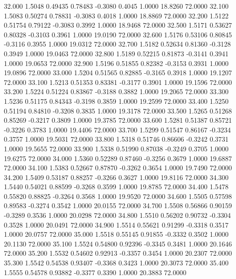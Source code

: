   32.000   1.5048   0.49435   0.78483  -0.3080   0.4045   1.0000  18.8260  72.0000
  32.100   1.5083   0.50274   0.78831  -0.3083   0.4018   1.0000  18.8869  72.0000
  32.200   1.5122   0.51754   0.79122  -0.3083   0.3992   1.0000  18.9468  72.0000
  32.500   1.5171   0.53627   0.80328  -0.3103   0.3961   1.0000  19.0190  72.0000
  32.600   1.5176   0.53106   0.80845  -0.3116   0.3955   1.0000  19.0312  72.0000
  32.700   1.5182   0.52634   0.81360  -0.3128   0.3949   1.0000  19.0463  72.0000
  32.800   1.5189   0.52215   0.81873  -0.3141   0.3941   1.0000  19.0653  72.0000
  32.900   1.5196   0.51855   0.82382  -0.3153   0.3931   1.0000  19.0896  72.0000
  33.000   1.5204   0.51565   0.82885  -0.3165   0.3918   1.0000  19.1207  72.0000
  33.100   1.5213   0.51353   0.83381  -0.3177   0.3901   1.0000  19.1596  72.0000
  33.200   1.5224   0.51224   0.83867  -0.3188   0.3882   1.0000  19.2065  72.0000
  33.300   1.5236   0.51175   0.84343  -0.3198   0.3859   1.0000  19.2599  72.0000
  33.400   1.5250   0.51194   0.84810  -0.3208   0.3835   1.0000  19.3178  72.0000
  33.500   1.5265   0.51268   0.85269  -0.3217   0.3809   1.0000  19.3785  72.0000
  33.600   1.5281   0.51387   0.85721  -0.3226   0.3783   1.0000  19.4406  72.0000
  33.700   1.5299   0.51547   0.86167  -0.3234   0.3757   1.0000  19.5031  72.0000
  33.800   1.5318   0.51746   0.86606  -0.3242   0.3731   1.0000  19.5655  72.0000
  33.900   1.5338   0.51990   0.87038  -0.3249   0.3705   1.0000  19.6275  72.0000
  34.000   1.5360   0.52289   0.87460  -0.3256   0.3679   1.0000  19.6887  72.0000
  34.100   1.5383   0.52667   0.87870  -0.3262   0.3654   1.0000  19.7490  72.0000
  34.200   1.5409   0.53187   0.88257  -0.3266   0.3627   1.0000  19.8116  72.0000
  34.300   1.5440   0.54021   0.88599  -0.3268   0.3599   1.0000  19.8785  72.0000
  34.400   1.5478   0.55820   0.88825  -0.3264   0.3568   1.0000  19.9520  72.0000
  34.600   1.5505   0.57598   0.89583  -0.3274   0.3542   1.0000  20.0155  72.0000
  34.700   1.5508   0.56866   0.90159  -0.3289   0.3536   1.0000  20.0298  72.0000
  34.800   1.5510   0.56202   0.90732  -0.3304   0.3528   1.0000  20.0491  72.0000
  34.900   1.5514   0.55621   0.91299  -0.3318   0.3517   1.0000  20.0757  72.0000
  35.000   1.5518   0.55145   0.91855  -0.3332   0.3502   1.0000  20.1130  72.0000
  35.100   1.5524   0.54800   0.92396  -0.3345   0.3481   1.0000  20.1646  72.0000
  35.200   1.5532   0.54602   0.92913  -0.3357   0.3454   1.0000  20.2307  72.0000
  35.300   1.5542   0.54538   0.93407  -0.3368   0.3423   1.0000  20.3073  72.0000
  35.400   1.5555   0.54578   0.93882  -0.3377   0.3390   1.0000  20.3883  72.0000
